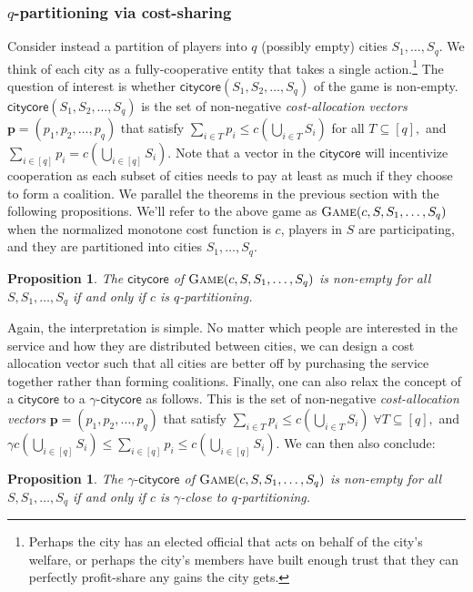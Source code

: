 \documentclass[11pt]{article}%
\newtheorem{proposition}[theorem]{Proposition}
\numberwithin{theorem}{subsection}
\newcommand{\game}{\textsc{Game}}
\newcommand{\citycore}{{\mathsf{citycore}}}
\newcommand{\gammacitycore}{\gamma\text{-}\mathsf{citycore}}
\begin{document}
\subsubsection{$q$-partitioning via cost-sharing}
Consider instead a partition of players into $q$ (possibly empty) cities $S_1,\ldots, S_q$. We think of each city as a fully-cooperative entity that takes a single action.\footnote{Perhaps the city has an elected official that acts on behalf of the city's welfare, or perhaps the city's members have built enough trust that they can perfectly profit-share any gains the city gets.} The question of interest is whether $\citycore(S_1, S_2, \ldots, S_q)$ of the game is non-empty. $\citycore(S_1, S_2, \ldots, S_q)$ is the set of non-negative \textit{cost-allocation vectors} $\mathbf{p} = (p_1, p_2, \ldots, p_q)$ that satisfy $\sum_{i\in T}p_i \le c(\bigcup_{i\in T}S_i)$ for all $T\subseteq [q],$ and $\sum_{i\in [q]}p_i = c(\bigcup_{i \in [q]}S_i).$ Note that a vector in the $\citycore$ will incentivize cooperation as each subset of cities needs to pay at least as much if they choose to form a coalition. We parallel the theorems in the previous section with the following propositions. We'll refer to the above game as $\game(c,S,S_1,\ldots, S_q)$ when the normalized monotone cost function is $c$, players in $S$ are participating, and they are partitioned into cities $S_1,\ldots, S_q$. 

\begin{proposition}
\label{prop:maincostsharing}
The $\citycore$ of $\game(c,S,S_1,\ldots, S_q)$
is non-empty for all $S,S_1,\ldots, S_q$
if and only if $c$ is $q$-partitioning.
\end{proposition}

Again, the interpretation is simple. No matter
which people are interested in the service and how they are distributed between cities, we can design a cost allocation vector such that all cities are better off by purchasing the service together rather than forming coalitions. Finally, one can also relax the concept of a $\citycore$ to a $\gammacitycore$ as follows. This is the set of non-negative \textit{cost-allocation vectors} $\mathbf{p} = (p_1, p_2, \ldots, p_q)$ that satisfy $\sum_{i\in T}p_i \le c(\bigcup_{i\in T}S_i) \; \forall T\subseteq [q],$ and 
$\gamma c(\bigcup_{i \in [q]}S_i)\le \sum_{i\in [q]}p_i \le c(\bigcup_{i \in [q]}S_i).$ We can then also conclude:

\begin{proposition}
\label{prop:gammacitycore}
The $\gammacitycore$ of $\game(c,S,S_1,\ldots, S_q)$
is non-empty for all $S,S_1,\ldots, S_q$
if and only if $c$ is $\gamma$-close to $q$-partitioning.
\end{proposition}
\end{document}
